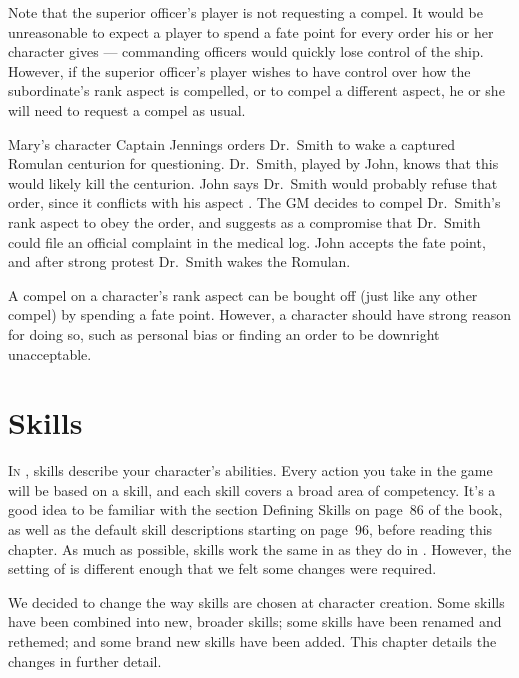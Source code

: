 \documentclass[12pt,titlepage,openany]{book}
\begin{document}
Note that the superior officer's player is not requesting a compel. It would be
unreasonable to expect a player to spend a fate point for every order his or
her character gives --- commanding officers would quickly lose control of the
ship. However, if the superior officer's player wishes to have control over
how the subordinate's rank aspect is compelled, or to compel a different
aspect, he or she will need to request a compel as usual.

\begin{example}
    Mary's character Captain Jennings orders Dr.\ Smith to wake a captured
    Romulan centurion for questioning. Dr.\ Smith, played by John, knows that
    this would likely kill the centurion. John says Dr.\ Smith would probably
    refuse that order, since it conflicts with his aspect .
    The GM decides to compel Dr.\ Smith's rank aspect  to
    obey the order, and suggests as a compromise that Dr.\ Smith could file an
    official complaint in the medical log. John accepts the fate point, and
    after strong protest Dr.\ Smith wakes the Romulan.
\end{example}

A compel on a character's rank aspect can be bought off (just like any other
compel) by spending a fate point. However, a character should have strong
reason for doing so, such as personal bias or finding an order to be downright
unacceptable.



\chapter{Skills}\label{chap:skills}

\lettrine[lines=1]{I}{n} \Fate{}, skills describe your character's abilities.
Every action you take in the game will be based on a skill, and each skill
covers a broad area of competency. It's a good idea to be familiar with the
section Defining Skills on page~86 of the \FateCore{} book, as well as the
default skill descriptions starting on page~96, before reading this chapter. As
much as possible, skills work the same in \StarTrekFate{} as they do in
\FateCore{}. However, the setting of \StarTrek{} is different enough that we
felt some changes were required.

We decided to change the way skills are chosen at character creation. Some
skills have been combined into new, broader skills; some skills have been
renamed and rethemed; and some brand new skills have been added. This chapter
details the changes in further detail.
\end{document}
